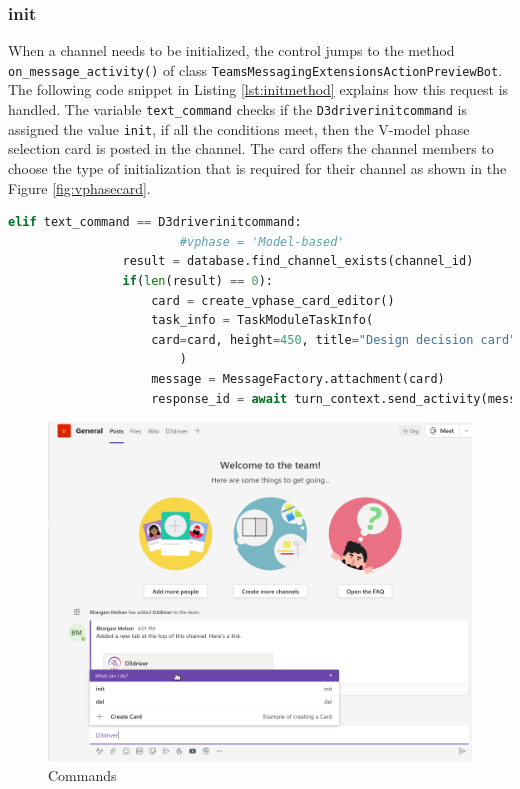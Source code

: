 \subsubsection{\textbf{init}}
\label{init}
When a channel needs to be initialized, the control jumps to the method  \texttt{on\_message\_activity()} of class \texttt{TeamsMessagingExtensionsActionPreviewBot}. The following code snippet in Listing \ref{lst:initmethod} explains how this request is handled. The variable \texttt{text\_command} checks if the \texttt{D3driverinitcommand} is assigned the value \texttt{init}, if all the conditions meet, then the V-model phase selection card is posted in the channel. The card offers the channel members to choose the type of initialization that is required for their channel as shown in the Figure \ref{fig:vphasecard}. 

\begin{lstlisting}[caption={init command handling},label={lst:initmethod},language=python]
elif text_command == D3driverinitcommand:
                        #vphase = 'Model-based'
                result = database.find_channel_exists(channel_id)
                if(len(result) == 0):
                    card = create_vphase_card_editor()
                    task_info = TaskModuleTaskInfo(
                    card=card, height=450, title="Design decision card", width=500
                        )
                    message = MessageFactory.attachment(card)
                    response_id = await turn_context.send_activity(message)
\end{lstlisting}


\begin{figure}[h]
\centering
\includegraphics[width=0.7\linewidth]{figures/commands}
\captionsetup{justification=centering}
\caption{Commands}
\label{fig:commands}
\end{figure}
 
